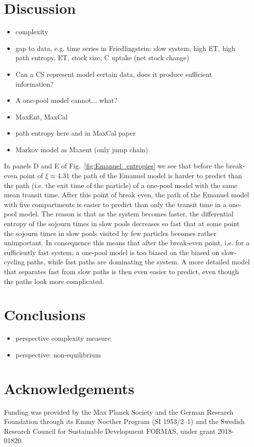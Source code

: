 \documentclass[smallextended]{svjour3}
\begin{document}
\section{Discussion}
\begin{itemize}
  \item complexity
  \item gap to data, e.g. time series in Friedlingstein: slow system, high ET, high path entropy, ET, stock size, C uptake (net stock change)
  \item Can a CS represent model certain data, does it produce sufficient information?
  \item A one-pool model cannot... what?
  \item MaxEnt, MaxCal
  \item path entropy here and in MaxCal paper \citep{Presse2013RMP}
  \item Markov model as Maxent (only jump chain) \citep{Ge2012JCP}
\end{itemize}

In panels D and E of Fig.~\ref{fig:Emanuel_entropies} we see that before the break-even point of $\xi\approx4.31$ the path of the Emanuel model is harder to predict than the path (i.e. the exit time of the particle) of a one-pool model with the same mean transit time.
After this point of break even, the path of the Emanuel model with five compartments is easier to predict than only the transit time in a one-pool model.
The reason is that as the system becomes faster, the differential entropy of the sojourn times in slow pools decreases so fast that at some point the sojourn times in slow pools visited by few particles becomes rather unimportant.
In consequence this means that after the break-even point, i.e. for a sufficiently fast system, a one-pool model is too biased on the biased on slow-cycling paths, while fast paths are dominating the system.
A more detailed model that separates fast from slow paths is then even easier to predict, even though the paths look more complicated.



\section{Conclusions}
\begin{itemize}
  \item perspective complexity measure
  \item perspective: non-equilibrium
\end{itemize}




\section{Acknowledgements}
Funding was provided by the Max Planck Society and the German Research Foundation through its Emmy Noether Program (SI 1953/2--1) and the Swedish Research Council for Sustainable Development FORMAS, under grant 2018-01820.






\appendix
\end{document}
